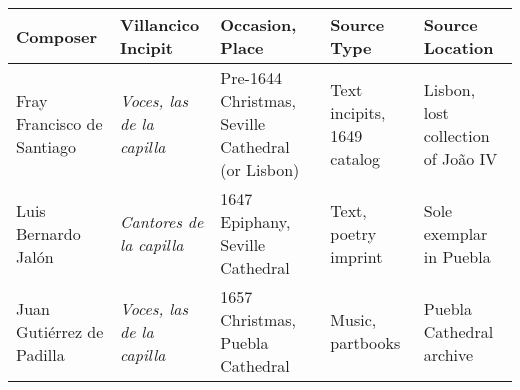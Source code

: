 \begingroup
\footnotesize
\renewcommand{\arraystretch}{1.5}
\noindent\begin{tabulary}{\textwidth}{LLLLL}
    \toprule
    Composer & Villancico Incipit & Occasion, Place & Source Type & Source
    Location \\ \midrule
    
    Fray Francisco de Santiago & 
    \emph{Voces, las de la capilla} &
    Pre-1644 Christmas, Seville Cathedral (or Lisbon) &
    Text incipits, 1649 catalog &
    Lisbon, lost collection of João IV \\

    Luis Bernardo Jalón & 
    \emph{Cantores de la capilla} & 
    1647 Epiphany, Seville Cathedral & 
    Text, poetry imprint & 
    Sole exemplar in Puebla \\

    Juan Gutiérrez de Padilla & 
    \emph{Voces, las de la capilla} & 
    1657 Christmas, Puebla Cathedral & 
    Music, partbooks & 
    Puebla Cathedral archive \\
    \bottomrule
\end{tabulary}
\endgroup
\endinput
